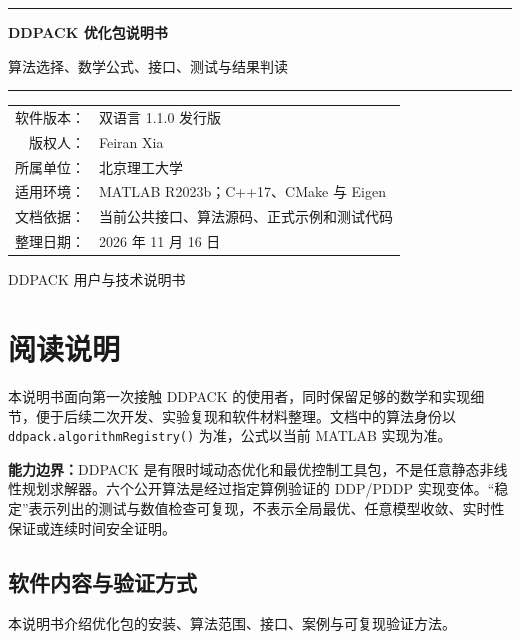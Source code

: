 \documentclass[UTF8,zihao=-4,openany,fontset=fandol]{ctexbook}
\newcommand{\code}[1]{\nolinkurl{#1}}
\newcommand{\important}[1]{%
  \begin{center}
  \colorbox{ddlight}{\parbox{0.91\textwidth}{#1}}
  \end{center}}
\begin{document}
\frontmatter

\begin{titlepage}
  \centering
  \vspace*{2.3cm}
  {\color{ddblue}\rule{\textwidth}{1.5pt}\par}
  \vspace{1.1cm}
  {\Huge\bfseries DDPACK 优化包说明书\par}
  \vspace{0.6cm}
  {\Large 算法选择、数学公式、接口、测试与结果判读\par}
  \vspace{1.1cm}
  {\color{ddblue}\rule{\textwidth}{1.5pt}\par}
  \vfill
  \begin{tabular}{rl}
    软件版本： & 双语言 1.1.0 发行版\\
    版权人： & Feiran Xia\\
    所属单位： & 北京理工大学\\
    适用环境： & MATLAB R2023b；C++17、CMake 与 Eigen\\
    文档依据： & 当前公共接口、算法源码、正式示例和测试代码\\
    整理日期： & 2026 年 11 月 16 日
  \end{tabular}
  \vfill
  {\large DDPACK 用户与技术说明书\par}
\end{titlepage}

\chapter*{阅读说明}

本说明书面向第一次接触 DDPACK 的使用者，同时保留足够的数学和实现细节，便于后续二次开发、实验复现和软件材料整理。文档中的算法身份以
\code{ddpack.algorithmRegistry()} 为准，公式以当前 MATLAB 实现为准。

\important{\textbf{能力边界：}DDPACK 是有限时域动态优化和最优控制工具包，不是任意静态非线性规划求解器。六个公开算法是经过指定算例验证的 DDP/PDDP 实现变体。“稳定”表示列出的测试与数值检查可复现，不表示全局最优、任意模型收敛、实时性保证或连续时间安全证明。}

\section*{软件内容与验证方式}

本说明书介绍优化包的安装、算法范围、接口、案例与可复现验证方法。
\end{document}
